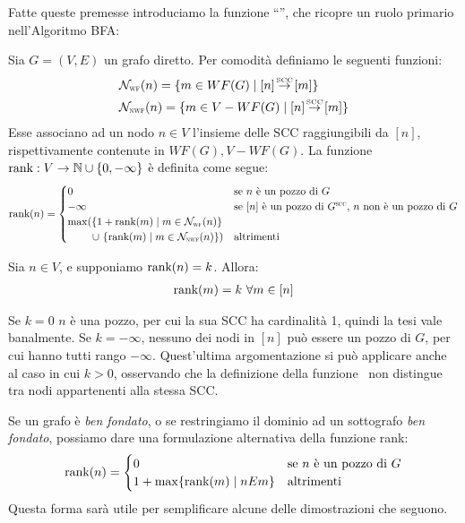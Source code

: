 Fatte queste premesse introduciamo la funzione ``\rankfunc'', che ricopre un ruolo primario nell'Algoritmo BFA:
\begin{definition}
    Sia $G = (V,E)$ un grafo diretto. Per comodità definiamo le seguenti funzioni:
    \begin{align*}
        &\mathcal{N}_{\scalebox{0.5}{WF}}(n) = \{m \in WF(G) \mid [n] \sccto [m]\}\\
        &\mathcal{N}_{\scalebox{0.5}{NWF}}(n) = \{m \in V - WF(G) \mid [n] \sccto [m]\}
    \end{align*}
    Esse associano ad un nodo $n \in V$ l'insieme delle SCC raggiungibili da $[n]$, rispettivamente contenute in $WF(G), V - WF(G)$.
    La funzione $\textup{rank}: V \to \mathbb{N} \cup \{0, -\infty\}$ è definita come segue:
    \begin{gather*}
        \rankfunc(n) = \begin{cases}
            0 &\text{se $n$ è un pozzo di $G$}\\
            -\infty &\text{se $[n]$ è un pozzo di $G^{\scalebox{.5}{SCC}}$, $n$ non è un pozzo di $G$}\\
            \max(\{1 + \rankfunc(m) \mid m \in \mathcal{N_{\scalebox{0.5}{WF}}}(n)\}\\
            \,\,\,\,\,\,\,\,\,\,\,\,\,\, \cup \,\, \{\rankfunc(m) \mid m \in \mathcal{N_{\scalebox{0.5}{NWF}}}(n)\}) &\text{altrimenti}
        \end{cases}
    \end{gather*}
\end{definition}
\begin{observation}
    Sia $n \in V$, e supponiamo $\textup{rank}(n) = k$. Allora:
    \begin{gather*}
        \textup{rank}(m) = k \,\,\forall m \in [n]
    \end{gather*}
\end{observation}
\begin{proof2}
    Se $k = 0$ $n$ è una pozzo, per cui la sua SCC ha cardinalità 1, quindi la tesi vale banalmente. Se $k = -\infty$, nessuno dei nodi in $[n]$ può essere un pozzo di $G$, per cui hanno tutti rango $-\infty$. Quest'ultima argomentazione si può applicare anche al caso in cui $k > 0$, osservando che la definizione della funzione \rankfunc \, non distingue tra nodi appartenenti alla stessa SCC.
\end{proof2}
Se un grafo è \emph{ben fondato}, o se restringiamo il dominio ad un sottografo \emph{ben fondato}, possiamo dare una formulazione alternativa della funzione rank:
\begin{gather*}
        \textup{rank}(n) = \begin{cases}
            0 &\text{se $n$ è un pozzo di $G$}\\
            1 + \max\{\textup{rank}(m) \mid n E m\} &\text{altrimenti}
        \end{cases}
\end{gather*}
Questa forma sarà utile per semplificare alcune delle dimostrazioni che seguono.

